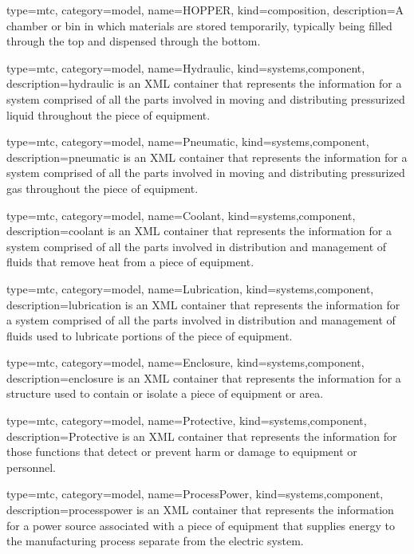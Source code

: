 {
  type=mtc,
  category=model,
  name={HOPPER},
  kind={composition},
  description={A chamber or bin in which materials are stored temporarily, typically being filled through the top and dispensed through the bottom.}
}


{
  type=mtc,
  category=model,
  name={Hydraulic},
  kind={systems,component},
  description={\gls{hydraulic} is an XML container that represents the information for a system comprised of all the parts involved in moving and distributing pressurized liquid throughout the piece of equipment.}
}


{
  type=mtc,
  category=model,
  name={Pneumatic},
  kind={systems,component},
  description={\gls{pneumatic} is an XML container that represents the information for a system comprised of all the parts involved in moving and distributing pressurized gas throughout the piece of equipment.}
}


{
  type=mtc,
  category=model,
  name={Coolant},
  kind={systems,component},
  description={\gls{coolant} is an XML container that represents the information for a system comprised of all the parts involved in distribution and management of fluids that remove heat from a piece of equipment.}
}


{
  type=mtc,
  category=model,
  name={Lubrication},
  kind={systems,component},
  description={\gls{lubrication} is an XML container that represents the information for a system comprised of all the parts involved in distribution and management of fluids used to lubricate portions of the piece of equipment.}
}


{
  type=mtc,
  category=model,
  name={Enclosure},
  kind={systems,component},
  description={\gls{enclosure} is an XML container that represents the information for a structure used to contain or isolate a piece of equipment or area.}
}


{
  type=mtc,
  category=model,
  name={Protective},
  kind={systems,component},
  description={Protective is an XML container that represents the information for those functions that detect or prevent harm or damage to equipment or personnel.}
}


{
  type=mtc,
  category=model,
  name={ProcessPower},
  kind={systems,component},
  description={\gls{processpower} is an XML container that represents the information for a power source associated with a piece of equipment that supplies energy to the manufacturing process separate from the \gls{electric} system.}
}


